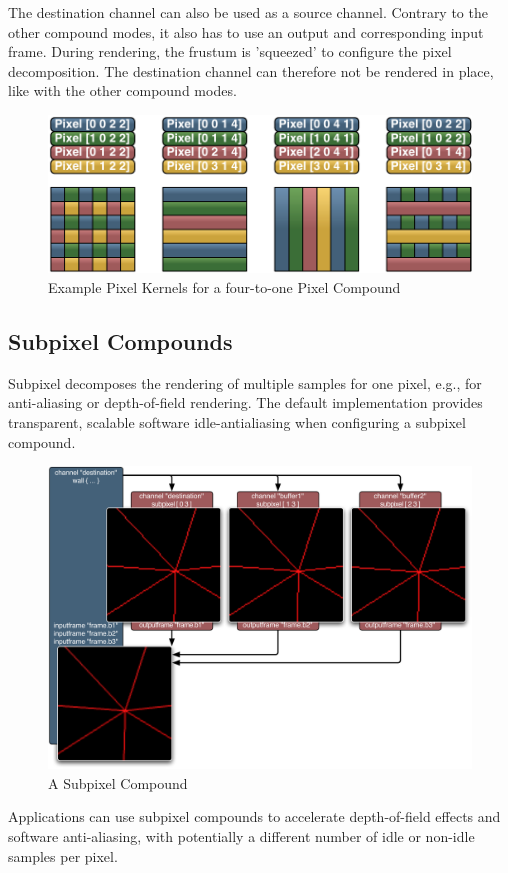 \documentclass[10pt,a4]{scrartcl}
\begin{document}
The destination channel can also be used as a source channel. Contrary
to the other compound modes, it also has to use an output and
corresponding input frame. During rendering, the frustum is 'squeezed'
to configure the pixel decomposition. The destination channel can
therefore not be rendered in place, like with the other compound modes.
\begin{figure}[ht!]\center
  \includegraphics[width=.9\textwidth]{images/pixelKernels.pdf}
  {\caption{\label{fPixelKernels}Example Pixel Kernels for a
      four-to-one Pixel Compound}}
\end{figure}


\subsection{\label{sSubpixel}Subpixel Compounds}

Subpixel decomposes the rendering of multiple samples for one pixel, e.g., for
anti-aliasing or depth-of-field rendering. The default implementation provides
transparent, scalable software idle-antialiasing when configuring a subpixel
compound.

\begin{figure}
  \includegraphics[width=.618\textwidth]{images/Subpixel.pdf}
  {\caption{\label{fSubpixel}\small A Subpixel Compound}}
\end{figure}
Applications can use subpixel compounds to accelerate depth-of-field effects and
software anti-aliasing, with potentially a different number of idle or non-idle
samples per pixel.
\end{document}
